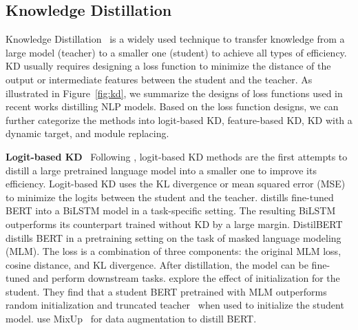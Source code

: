 \documentclass[letterpaper]{article} %
\newcommand{\paratitle}[1]{\noindent\textbf{#1}\ }
\begin{document}
\subsection{Knowledge Distillation}
Knowledge Distillation~\citep{hinton2015distilling} is a widely used technique to transfer knowledge from a large model (teacher) to a smaller one (student) to achieve all types of efficiency. KD usually requires designing a loss function to minimize the distance of the output or intermediate features between the student and the teacher. As illustrated in Figure~\ref{fig:kd}, we summarize the designs of loss functions used in recent works distilling NLP models. Based on the loss function designs, we can further categorize the methods into logit-based KD, feature-based KD, KD with a dynamic target, and module replacing.

\paratitle{Logit-based KD} Following \citet{hinton2015distilling}, logit-based KD methods are the first attempts to distill a large pretrained language model into a smaller one to improve its efficiency. Logit-based KD uses the KL divergence or mean squared error (MSE) to minimize the logits between the student and the teacher. \citet{tang2019distilling} distills fine-tuned BERT into a BiLSTM model in a task-specific setting. The resulting BiLSTM outperforms its counterpart trained without KD by a large margin. DistilBERT~\citep{sanh2019distilbert} distills BERT in a pretraining setting on the task of masked language modeling (MLM). The loss is a combination of three components: the original MLM loss, cosine distance, and KL divergence. After distillation, the model can be fine-tuned and perform downstream tasks. \citet{turc2019well} explore the effect of initialization for the student. They find that a student BERT pretrained with MLM outperforms random initialization and truncated teacher~\citep{sanh2019distilbert,pkd} when used to initialize the student model. \citet{mixkd} use MixUp~\citep{mixup} for data augmentation to distill BERT.
\end{document}
